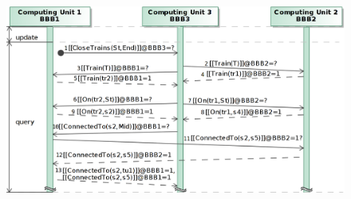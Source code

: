 \begin{figure}[h]
	\begin{center}
		\includegraphics[width=1\textwidth]{figures/seq-diagram-query-exec.png}
	\end{center}
\end{figure}
